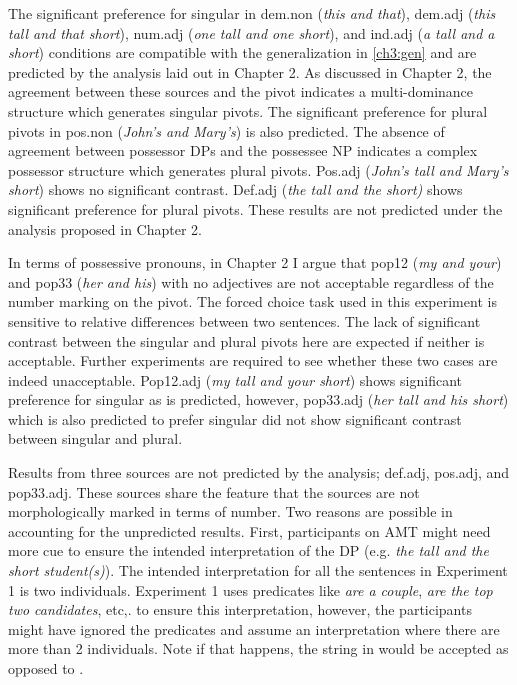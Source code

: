 \documentclass[
  11pt          %
  ,letterpaper  %
  ,center       %
  ,noupper      %
  ]{uconnthesis2}
\begin{document}
The significant preference for singular in dem.non (\textit{this and that}), dem.adj (\textit{this tall and that short}), num.adj (\textit{one tall and one short}), and ind.adj (\textit{a tall and a short}) conditions are compatible with the generalization in \ref{ch3:gen} and are predicted by the analysis laid out in Chapter 2. As discussed in Chapter 2, the agreement between these sources and the pivot indicates a multi-dominance structure which generates singular pivots. The significant preference for plural pivots in pos.non (\textit{John's and Mary's}) is also predicted. The absence of agreement between possessor DPs and the possessee NP indicates a complex possessor structure which generates plural pivots. Pos.adj (\textit{John's tall and Mary's short}) shows no significant contrast. Def.adj (\textit{the tall and the short)} shows significant preference for plural pivots. These results are not predicted under the analysis proposed in Chapter 2. 

In terms of possessive pronouns, in Chapter 2 I argue that pop12 (\textit{my and your}) and pop33 (\textit{her and his}) with no adjectives are not acceptable regardless of the number marking on the pivot.  The forced choice task used in this experiment is sensitive to relative differences between two sentences. The lack of significant contrast between the singular and plural pivots here are expected if neither is acceptable. Further experiments are required to see whether these two cases are indeed unacceptable. Pop12.adj (\textit{my tall and your short}) shows significant preference for singular as is predicted, however, pop33.adj (\textit{her tall and his short}) which is also predicted to prefer singular did not show significant contrast between singular and plural.

Results from three sources are not predicted by the analysis; def.adj, pos.adj, and pop33.adj. These sources share the feature that the sources are not morphologically marked in terms of number. Two reasons are possible in accounting for the unpredicted results. First, participants on AMT might need more cue to ensure the intended interpretation of the DP (e.g. \textit{the tall and the short student(s)}). The intended interpretation for all the sentences in Experiment 1 is two individuals. Experiment 1 uses predicates like \textit{are a couple}, \textit{are the top two candidates}, etc,. to ensure this interpretation, however, the participants might have ignored the predicates and assume an interpretation where there are more than 2 individuals. Note if that happens, the string in \Next[a] would be accepted as opposed to \Next[b].
\end{document}
